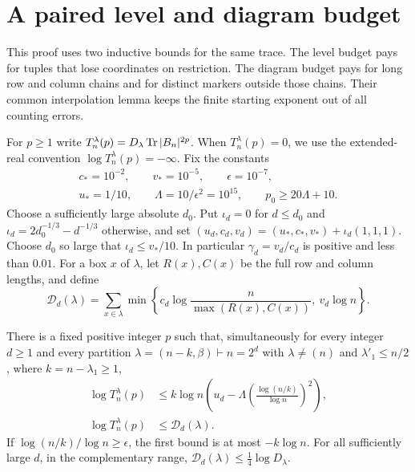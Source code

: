 \section{A paired level and diagram budget}
\label{rec:sec-hybrid}

This proof uses two inductive bounds for the same trace.  The level
budget pays for tuples that lose coordinates on restriction.  The
diagram budget pays for long row and column chains and for distinct
markers outside those chains.  Their common interpolation lemma keeps
the finite starting exponent out of all counting errors.

For $p\ge1$ write
$T_n^\lambda(p)=D_\lambda\operatorname{Tr}|B_n|^{2p}$.
When $T_n^\lambda(p)=0$, we use the extended-real convention
$\log T_n^\lambda(p)=-\infty$.
Fix the constants
\begin{equation}\label{rec:hybrid-constants}
 \begin{gathered}
 c_*=10^{-2},\qquad v_*=10^{-5},\qquad\epsilon=10^{-7},\\
 u_*=1/10,\qquad\Lambda=10/\epsilon^2=10^{15},\qquad
 p_0\ge20\Lambda+10.
 \end{gathered}
\end{equation}
Choose a sufficiently large absolute $d_0$.  Put $\iota_d=0$ for
$d\le d_0$ and
$\iota_d=2d_0^{-1/3}-d^{-1/3}$ otherwise, and set
$(u_d,c_d,v_d)=(u_*,c_*,v_*)+\iota_d(1,1,1)$.
Choose $d_0$ so large that $\iota_d\le v_*/10$.
In particular $\gamma_d=v_d/c_d$ is positive and less than $0.01$.
For a box $x$ of $\lambda$, let $R(x),C(x)$ be the full row and
column lengths, and define
\begin{equation}\label{rec:hybrid-diagram-weight}
 \mathcal D_d(\lambda)=
 \sum_{x\in\lambda}\min\left\{
 c_d\log\frac n{\max(R(x),C(x))},\ v_d\log n\right\}.
\end{equation}

\begin{theorem}\label{rec:hybrid-main}
There is a fixed positive integer $p$ such that, simultaneously for every
integer $d\ge1$ and every partition $\lambda=(n-k,\beta)\vdash n=2^d$
with $\lambda\ne(n)$ and $\lambda'_1\le n/2$, where
$k=n-\lambda_1\ge1$,
\begin{align}
 \log T_n^\lambda(p)&\le
 k\log n\left(u_d-\Lambda
          \left(\frac{\log(n/k)}{\log n}\right)^2\right),
       \label{rec:hybrid-level-budget}\\
 \log T_n^\lambda(p)&\le\mathcal D_d(\lambda).
       \label{rec:hybrid-diagram-budget}
\end{align}
If $\log(n/k)/\log n\ge\epsilon$, the first bound is at most
$-k\log n$.  For all sufficiently large $d$, in the complementary range,
$\mathcal D_d(\lambda)\le\tfrac14\log D_\lambda$.
\end{theorem}

